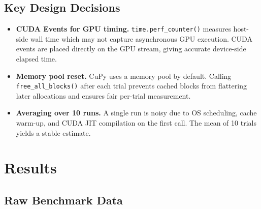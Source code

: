 \documentclass[12pt, a4paper]{article}
\begin{document}
\clearpage
\subsection{Key Design Decisions}

\begin{itemize}[leftmargin=1.4em, itemsep=3pt]
  \item \textbf{CUDA Events for GPU timing.} \texttt{time.perf\_counter()} measures host-side wall time which may not capture asynchronous GPU execution.  CUDA events are placed directly on the GPU stream, giving accurate device-side elapsed time.
  \item \textbf{Memory pool reset.} CuPy uses a memory pool by default.  Calling \texttt{free\_all\_blocks()} after each trial prevents cached blocks from flattering later allocations and ensures fair per-trial measurement.
  \item \textbf{Averaging over 10 runs.} A single run is noisy due to OS scheduling, cache warm-up, and CUDA JIT compilation on the first call.  The mean of 10 trials yields a stable estimate.
\end{itemize}

\section{Results}

\subsection{Raw Benchmark Data}
\end{document}
